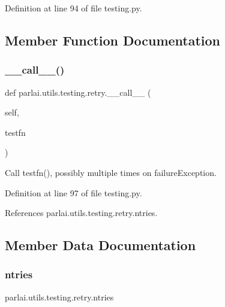 Definition at line 94 of file testing.\+py.



\subsection{Member Function Documentation}
\mbox{\label{classparlai_1_1utils_1_1testing_1_1retry_ac034808bb9ab13c8f8314d7069c6325e}} 
\subsubsection{\texorpdfstring{\+\_\+\+\_\+call\+\_\+\+\_\+()}{\_\_call\_\_()}}
{\footnotesize\ttfamily def parlai.\+utils.\+testing.\+retry.\+\_\+\+\_\+call\+\_\+\+\_\+ (\begin{DoxyParamCaption}\item[{}]{self,  }\item[{}]{testfn }\end{DoxyParamCaption})}

\begin{DoxyVerb}Call testfn(), possibly multiple times on failureException.\end{DoxyVerb}
 

Definition at line 97 of file testing.\+py.



References parlai.\+utils.\+testing.\+retry.\+ntries.



\subsection{Member Data Documentation}
\mbox{\label{classparlai_1_1utils_1_1testing_1_1retry_abd5233dc28b07a53cd11347e5e44c44f}} 
\subsubsection{\texorpdfstring{ntries}{ntries}}
{\footnotesize\ttfamily parlai.\+utils.\+testing.\+retry.\+ntries}



